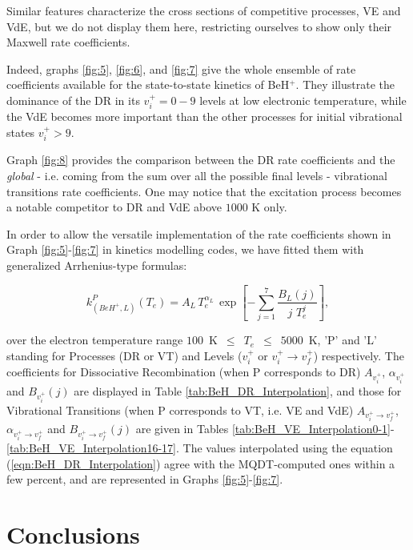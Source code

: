\documentclass[reviewcopy]{elsarticle}
\begin{document}
Similar features characterize the cross sections of competitive processes, VE and VdE,
but we do not display them here, restricting ourselves to show only their Maxwell rate coefficients.

Indeed,  graphs \ref{fig:5}, \ref{fig:6}, and \ref{fig:7} give the whole ensemble of  rate coefficients available for the state-to-state kinetics of BeH$^+$. They illustrate the dominance of the  DR in its $v_{i}^{+}=0-9$ levels at low electronic temperature, while the VdE becomes more important than the other processes for initial vibrational states $v_{i}^{+}>9$.

Graph
\ref{fig:8} provides the comparison between the DR rate coefficients and the 
{\textit{global}} - i.e. coming from the sum over all the possible final levels - vibrational transitions rate coefficients. One may notice that the excitation process becomes a notable competitor to DR and VdE above $1000$ K only.

In order to allow the versatile implementation of the rate coefficients  shown in 
Graph
\ref{fig:5}-\ref{fig:7} in kinetics modelling codes, we have fitted them with generalized Arrhenius-type formulas:

\begin{equation}\label{eqn:BeH_DR_Interpolation}
k_{(BeH^+,L)}^{P}(T_e) = A_{L} \, T_e^{\alpha_{L}} \, \exp\left[-\sum_{j=1}^{7}\frac{B_{L}(j)}{j\,\,T_e^j}\right],
\end{equation}

\noindent  over the electron temperature range $100$~K~$\leq$~$T_e$~$\leq$~$5000$~K, 'P' and 'L' standing for Processes (DR or VT) and Levels ($v^+_i$ or $v^+_i\to v^+_f$) respectively. 
The coefficients for Dissociative Recombination (when P corresponds to DR) $A_{v^+_i}$, $\alpha_{v^+_i}$ and $B_{v^+_i}(j)$ are displayed in Table \ref{tab:BeH_DR_Interpolation}, and those for Vibrational Transitions (when P corresponds to VT, i.e. VE and VdE)
 $A_{{v^+_i}\to {v^+_f}}$, $\alpha_{{v^+_i}\to {v^+_f}}$ and $B_{{v^+_i}\to {v^+_f}}(j)$ 
are given in Tables \ref{tab:BeH_VE_Interpolation0-1}-\ref{tab:BeH_VE_Interpolation16-17}. The values interpolated using the equation (\ref{eqn:BeH_DR_Interpolation}) agree with the MQDT-computed ones within a few percent, and are represented in 
Graphs
\ref{fig:5}-\ref{fig:7}.

\section{Conclusions}
\end{document}

